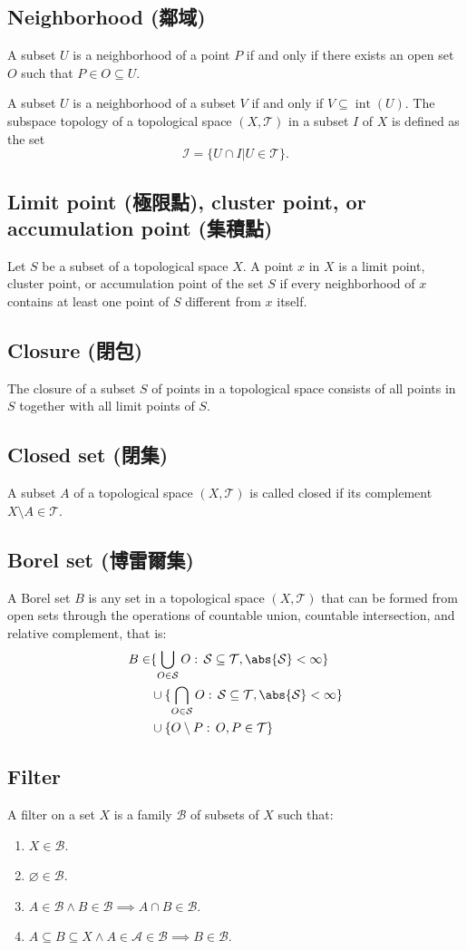 \documentclass[a4paper,12pt]{article}
\begin{document}
\subsection{Neighborhood (鄰域)}
A subset $U$ is a neighborhood of a point $P$ if and only if there exists an open set $O$ such that $P\in O\subseteq U$.

A subset $U$ is a neighborhood of a subset $V$ if and only if $V\subseteq\operatorname{int}(U)$.
The subspace topology of a topological space $(X,\mathcal{T})$ in a subset $I$ of $X$ is defined as the set 
\[\mathcal{I}=\{U\cap I | U\in\mathcal{T}\}.\]
\subsection{Limit point (極限點), cluster point, or accumulation point (集積點)}
Let $S$ be a subset of a topological space $X$. A point $x$ in $X$ is a limit point, cluster point, or accumulation point of the set $S$ if every neighborhood of $x$ contains at least one point of $S$ different from $x$ itself.
\subsection{Closure (閉包)}
The closure of a subset $S$ of points in a topological space consists of all points in $S$ together with all limit points of $S$.
\subsection{Closed set (閉集)}
A subset $A$ of a topological space $(X,\mathcal{T})$ is called closed if its complement $X\setminus A\in\mathcal{T}$.
\subsection{Borel set (博雷爾集)}
A Borel set $B$ is any set in a topological space $(X,\mathcal{T})$ that can be formed from open sets through the operations of countable union, countable intersection, and relative complement, that is:
\[\begin{aligned}
B\in &\{\bigcup_{O\in\mathcal{S}}O:\,\mathcal{S}\subseteq\mathcal{T},\abs{\mathcal{S}}<\infty\}\\
& \cup \{\bigcap_{O\in\mathcal{S}}O:\,\mathcal{S}\subseteq\mathcal{T},\abs{\mathcal{S}}<\infty\}\\
& \cup \{O\setminus P:\,O,P\in\mathcal{T}\}
\end{aligned}\]
\subsection{Filter}
A filter on a set $X$ is a family $\mathcal{B}$ of subsets of $X$ such that: 
\begin{enumerate}
\item $X\in\mathcal{B}$.
\item $\varnothing\in\mathcal{B}$.
\item $A\in\mathcal{B}\land B\in\mathcal{B}\implies A\cap B\in\mathcal{B}$.
\item $A\subseteq B\subseteq X\land A\in\mathcal{A}\in\mathcal{B}\implies B\in\mathcal{B}$.
\end{enumerate}
\end{document}
